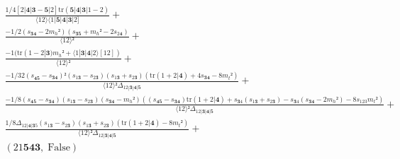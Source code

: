 \documentclass[varwidth, border=5pt]{standalone}
\newcommand{\tr}{\text{tr}}
\begin{document}
\begin{my}
$\begin{gathered}
\scriptscriptstyle\frac{1/4[2|𝟒|𝟑-𝟓|2]\tr(𝟓|𝟒|𝟑|1-2)}{⟨12⟩⟨1|𝟓|𝟒|𝟑|2]} +\\
\scriptscriptstyle\frac{-1/2(s_{𝟑𝟒}-2m_h²)(s_{𝟑𝟓}+m_h²-2s_{2𝟒})}{⟨12⟩²} +\\
\scriptscriptstyle\frac{-1(\tr(1-2|𝟑)m_h²+⟨1|𝟑|𝟒|2⟩[12])}{⟨12⟩²} +\\
\scriptscriptstyle\frac{-1/32(s_{𝟒𝟓}-s_{𝟑𝟒})²(s_{1𝟑}-s_{2𝟑})(s_{1𝟑}+s_{2𝟑})(\tr(1+2|𝟒)+4s_{𝟑𝟒}-8m_t²)}{⟨12⟩²Δ_{12|𝟑|𝟒|𝟓}} +\\
\scriptscriptstyle\frac{-1/8(s_{𝟒𝟓}-s_{𝟑𝟒})(s_{1𝟑}-s_{2𝟑})(s_{𝟑𝟒}-m_h²)((s_{𝟒𝟓}-s_{𝟑𝟒})\tr(1+2|𝟒)+s_{𝟑4}(s_{1𝟑}+s_{2𝟑})-s_{𝟑4}(s_{𝟑𝟒}-2m_h²)-8s_{123}m_t²)}{⟨12⟩²Δ_{12|𝟑|𝟒|𝟓}} +\\
\scriptscriptstyle\frac{1/8Δ_{12|𝟒|𝟑5}(s_{1𝟑}-s_{2𝟑})(s_{1𝟑}+s_{2𝟑})(\tr(1+2|𝟒)-8m_t²)}{⟨12⟩²Δ_{12|𝟑|𝟒|𝟓}} +\\
\scriptscriptstyle(21𝟓𝟒𝟑,\;\text{False}) \phantom{+}
\end{gathered}$
\end{my}
\end{document}
